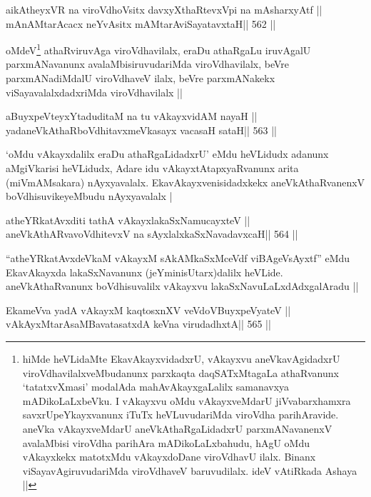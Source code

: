 \begin{shl}
aikAtheyxVR na viroVdhoV\s sitx davxyXthaRtevxV\s pi na mAsharxyAtf ||
mAnAMtarAcacx neYvAsitx mAMtarAviSayatavxtaH\hfill || 562 ||
\end{shl}

\begin{artha}
oMdeV\footnote[1]{hiMde heVLidaMte EkavAkayxvidadxrU, vAkayxvu
  aneVkavAgidadxrU viroVdhavilalxveMbudanunx parxkaqta daqSATxMtagaLa
  athaRvanunx `tatatxvXmasi' modalAda mahAvAkayxgaLalilx samanavxya
  mADikoLaLxbeVku. I vAkayxvu oMdu vAkayxveMdarU jiVvabarxhamxra
  savxrUpeYkayxvanunx iTuTx heVLuvudariMda viroVdha parihAravide.
  aneVka vAkayxveMdarU aneVkAthaRgaLidadxrU parxmANavanenxV avalaMbisi
  viroVdha parihAra mADikoLaLxbahudu, hAgU oMdu vAkayxkekx matotxMdu
  vAkayxdoDane viroVdhavU ilalx. Binanx viSayavAgiruvudariMda
  viroVdhaveV baruvudilalx. ideV vAtiRkada Ashaya ||} athaRviruvAga viroVdhavilalx, eraDu athaRgaLu iruvAgalU
parxmANavanunx avalaMbisiruvudariMda viroVdhavilalx, beVre
parxmANadiMdalU viroVdhaveV ilalx, beVre parxmANakekx
viSayavalalxdadxriMda viroVdhavilalx ||
\end{artha}

\begin{shl}
aBuyxpeVteyxYtaduditaM na tu vAkayxvidAM nayaH ||
yadaneVkAthaRboVdhitavxmeVkasayx vacasaH sataH\hfill || 563 ||
\end{shl}

\begin{artha}
`oMdu vAkayxdalilx eraDu athaRgaLidadxrU' eMdu heVLidudx adanunx
  aMgiVkarisi heVLidudx, Adare idu vAkayxtAtapxyaRvanunx arita
  (miVmAMsakara) nAyxyavalalx. EkavAkayxvenisidadxkekx
  aneVkAthaRvanenxV boVdhisuvikeyeMbudu nAyxyavalalx |
\end{artha}



\begin{shl}
atheYRkatAvxditi tathA vAkayxlakaSxNamucayxteV ||
aneVkAthARvavoVdhitevxV na sAyxlalxkaSxNavadavxcaH\hfill || 564 ||
\end{shl}

\begin{artha}
``atheYRkatAvxdeVkaM vAkayxM sAkAMkaSxMceVdf viBAgeVsAyxtf'' eMdu
  EkavAkayxda lakaSxNavanunx (jeYminisUtarx)dalilx heVLide.
  aneVkAthaRvanunx boVdhisuvalilx vAkayxvu lakaSxNavuLaLxdAdxgalAradu 
  ||
\end{artha}

\begin{shl}
EkameVva yadA vAkayxM kaqtosxnXV veVdoV\s BuyxpeVyateV ||
vAkAyxMtarAsaMBavatasatxdA keVna virudadhxtA\hfill || 565 ||
\end{shl}

